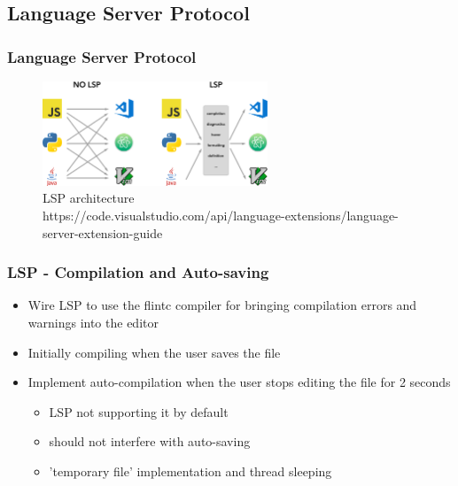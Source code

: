 \documentclass[aspectratio=169]{beamer}
\begin{document}
\subsection{Language Server Protocol}

\begin{frame}
\frametitle{Language Server Protocol}
\begin{figure}
    \centering
    \includegraphics[width=0.6\textwidth]{figures/lsp.png}
    \caption* {LSP architecture \\ \tiny {https://code.visualstudio.com/api/language-extensions/language-server-extension-guide}}
\end{figure}
\end{frame}

\begin{frame}
\frametitle{LSP - Compilation and Auto-saving}
\begin{itemize}
    \item Wire LSP to use the flintc compiler for bringing compilation errors and warnings into the editor
    \item Initially compiling when the user saves the file
    \item Implement auto-compilation when the user stops editing the file for 2 seconds
    \begin{itemize}
        \item LSP not supporting it by default
        \item should not interfere with auto-saving
        \item 'temporary file' implementation and thread sleeping
    \end{itemize}
\end{itemize}
\end{frame}
\end{document}
